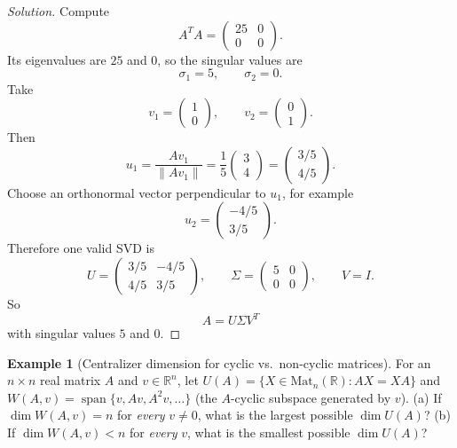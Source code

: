 \documentclass[11pt]{article}
\theoremstyle{definition}
\newtheorem{example}{Example}[section]
\newcommand{\R}{\mathbb{R}}
\newcommand{\Span}{\operatorname{span}}
\begin{document}
\begin{proof}[Solution]
Compute
\[
A^TA=\begin{pmatrix}25&0\\0&0\end{pmatrix}.
\]
Its eigenvalues are $25$ and $0$, so the singular values are
\[
\sigma_1=5, \qquad \sigma_2=0.
\]
Take
\[
v_1=\begin{pmatrix}1\\0\end{pmatrix}, \qquad v_2=\begin{pmatrix}0\\1\end{pmatrix}.
\]
Then
\[
u_1=\frac{Av_1}{\|Av_1\|}=\frac{1}{5}\begin{pmatrix}3\\4\end{pmatrix}=
\begin{pmatrix}3/5\\4/5\end{pmatrix}.
\]
Choose an orthonormal vector perpendicular to $u_1$, for example
\[
u_2=\begin{pmatrix}-4/5\\3/5\end{pmatrix}.
\]
Therefore one valid SVD is
\[
U=\begin{pmatrix}3/5&-4/5\\4/5&3/5\end{pmatrix},
\qquad
\Sigma=\begin{pmatrix}5&0\\0&0\end{pmatrix},
\qquad
V=I.
\]
So
\[
\boxed{A=U\Sigma V^T}
\]
with singular values $5$ and $0$.
\end{proof}

\begin{example}[Centralizer dimension for cyclic vs.\ non-cyclic matrices]
For an $n\times n$ real matrix $A$ and $v\in\R^n$, let $U(A)=\{X\in\mathrm{Mat}_n(\R): AX=XA\}$ and $W(A,v)=\Span\{v,Av,A^2v,\dots\}$ (the $A$-cyclic subspace generated by $v$).
(a) If $\dim W(A,v)=n$ for \emph{every} $v\neq0$, what is the largest possible $\dim U(A)$?
(b) If $\dim W(A,v)<n$ for \emph{every} $v$, what is the smallest possible $\dim U(A)$?
\end{example}
\end{document}
